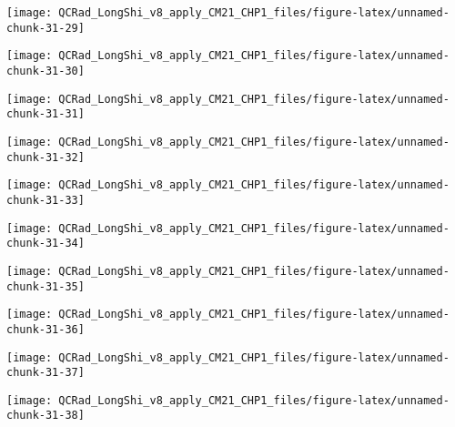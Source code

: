 \documentclass[
  10pt,
  a4paper,oneside]{article}
\begin{document}
\begin{center}\texttt{[image: QCRad\_LongShi\_v8\_apply\_CM21\_CHP1\_files/figure-latex/unnamed-chunk-31-29]} \end{center}

\begin{center}\texttt{[image: QCRad\_LongShi\_v8\_apply\_CM21\_CHP1\_files/figure-latex/unnamed-chunk-31-30]} \end{center}

\begin{center}\texttt{[image: QCRad\_LongShi\_v8\_apply\_CM21\_CHP1\_files/figure-latex/unnamed-chunk-31-31]} \end{center}

\begin{center}\texttt{[image: QCRad\_LongShi\_v8\_apply\_CM21\_CHP1\_files/figure-latex/unnamed-chunk-31-32]} \end{center}

\begin{center}\texttt{[image: QCRad\_LongShi\_v8\_apply\_CM21\_CHP1\_files/figure-latex/unnamed-chunk-31-33]} \end{center}

\begin{center}\texttt{[image: QCRad\_LongShi\_v8\_apply\_CM21\_CHP1\_files/figure-latex/unnamed-chunk-31-34]} \end{center}

\begin{center}\texttt{[image: QCRad\_LongShi\_v8\_apply\_CM21\_CHP1\_files/figure-latex/unnamed-chunk-31-35]} \end{center}

\begin{center}\texttt{[image: QCRad\_LongShi\_v8\_apply\_CM21\_CHP1\_files/figure-latex/unnamed-chunk-31-36]} \end{center}

\begin{center}\texttt{[image: QCRad\_LongShi\_v8\_apply\_CM21\_CHP1\_files/figure-latex/unnamed-chunk-31-37]} \end{center}

\begin{center}\texttt{[image: QCRad\_LongShi\_v8\_apply\_CM21\_CHP1\_files/figure-latex/unnamed-chunk-31-38]} \end{center}
\end{document}
